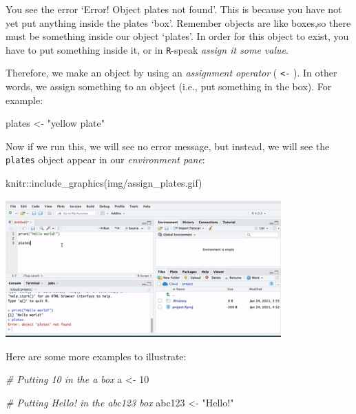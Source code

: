 \documentclass[
]{book}
\newenvironment{Shaded}{\begin{snugshade}}{\end{snugshade}}
\newcommand{\CommentTok}[1]{\textcolor[rgb]{0.56,0.35,0.01}{\textit{#1}}}
\newcommand{\DecValTok}[1]{\textcolor[rgb]{0.00,0.00,0.81}{#1}}
\newcommand{\FunctionTok}[1]{\textcolor[rgb]{0.00,0.00,0.00}{#1}}
\newcommand{\NormalTok}[1]{#1}
\newcommand{\OtherTok}[1]{\textcolor[rgb]{0.56,0.35,0.01}{#1}}
\newcommand{\SpecialCharTok}[1]{\textcolor[rgb]{0.00,0.00,0.00}{#1}}
\newcommand{\StringTok}[1]{\textcolor[rgb]{0.31,0.60,0.02}{#1}}
\begin{document}
You see the error `Error! Object plates not found'. This is because you have not yet put anything inside the plates `box'. Remember objects are like boxes,so there must be something inside our object `plates'. In order for this object to exist, you have to put something inside it, or in \texttt{R}-speak \emph{assign it some value}.

Therefore, we make an object by using an \emph{assignment operator} ( \texttt{\textless{}-} ). In other words, we assign something to an object (i.e., put something in the box). For example:

\begin{Shaded}
\begin{Highlighting}[]
\NormalTok{plates }\OtherTok{\textless{}{-}} \StringTok{"yellow plate"}
\end{Highlighting}
\end{Shaded}

Now if we run this, we will see no error message, but instead, we will see the \texttt{plates} object appear in our \emph{environment pane}:

\begin{Shaded}
\begin{Highlighting}[]
\NormalTok{knitr}\SpecialCharTok{::}\FunctionTok{include\_graphics}\NormalTok{(}\StringTok{\textquotesingle{}img/assign\_plates.gif\textquotesingle{}}\NormalTok{)}
\end{Highlighting}
\end{Shaded}

\includegraphics[width=400px]{img/assign_plates}

Here are some more examples to illustrate:

\begin{Shaded}
\begin{Highlighting}[]
\CommentTok{\# Putting \textquotesingle{}10\textquotesingle{} in the \textquotesingle{}a\textquotesingle{} box}
\NormalTok{a }\OtherTok{\textless{}{-}} \DecValTok{10}

\CommentTok{\# Putting \textquotesingle{}Hello!\textquotesingle{} in the \textquotesingle{}abc123\textquotesingle{} box}
\NormalTok{abc123 }\OtherTok{\textless{}{-}} \StringTok{"Hello!"}
\end{Highlighting}
\end{Shaded}
\end{document}
